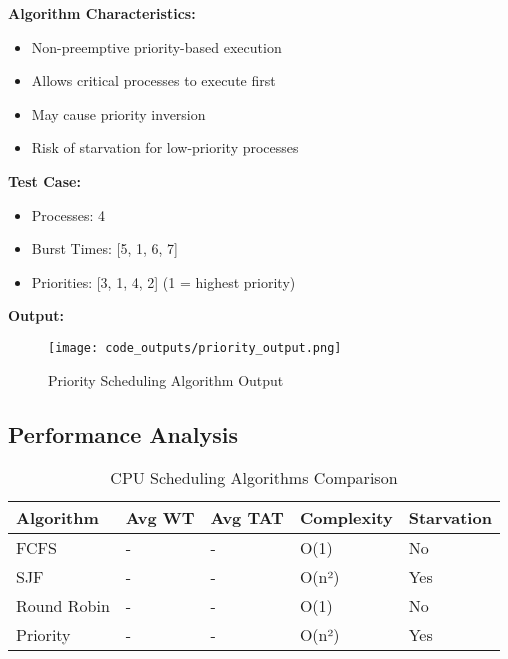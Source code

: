 \documentclass[12pt,a4paper]{article}
\begin{document}
\textbf{Algorithm Characteristics:}
\begin{itemize}
    \item Non-preemptive priority-based execution
    \item Allows critical processes to execute first
    \item May cause priority inversion
    \item Risk of starvation for low-priority processes
\end{itemize}

\textbf{Test Case:}
\begin{itemize}
    \item Processes: 4
    \item Burst Times: [5, 1, 6, 7]
    \item Priorities: [3, 1, 4, 2] (1 = highest priority)
\end{itemize}

\textbf{Output:}
\begin{figure}[H]
    \centering
    \texttt{[image: code\_outputs/priority\_output.png]}
    \caption{Priority Scheduling Algorithm Output}
    \label{fig:priority_output}
\end{figure}

\vspace{3cm}

\subsection{Performance Analysis}

\begin{table}[H]
\centering
\caption{CPU Scheduling Algorithms Comparison}
\begin{tabular}{|l|l|l|l|l|}
\hline
\textbf{Algorithm} & \textbf{Avg WT} & \textbf{Avg TAT} & \textbf{Complexity} & \textbf{Starvation} \\
\hline
FCFS & - & - & O(1) & No \\
\hline
SJF & - & - & O(n²) & Yes \\
\hline
Round Robin & - & - & O(1) & No \\
\hline
Priority & - & - & O(n²) & Yes \\
\hline
\end{tabular}
\label{tab:cpu_scheduling_comparison}
\end{table}

\vspace{2cm}
\end{document}
